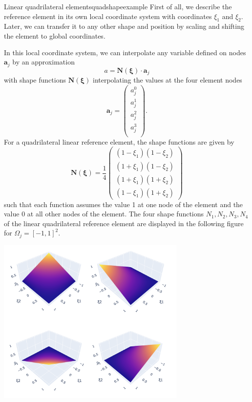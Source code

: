 \begin{example}{Linear quadrilateral elements}{quadshapeexample} 
    First of all, we describe the reference element in its own local coordinate system with coordinates $\xi_1$ and $\xi_2$. Later, we can transfer it to any other shape and position by scaling and shifting the element to global coordinates. 

    In this local coordinate system, we can interpolate any variable defined on nodes $\mathbf{a}_j$ by an approximation
    \begin{equation}
        a = \mathbf{N}(\pmb{\xi}) \cdot  \mathbf{a}_j
    \end{equation}
    with shape functions $\mathbf{N}(\pmb{\xi})$ interpolating the values at the four element nodes
    \begin{equation}
        \mathbf{a}_j = 
        \begin{pmatrix}
            a_j^0\\ 
            a_j^1\\ 
            a_j^2\\ 
            a_j^3\\
        \end{pmatrix}.
    \end{equation}
    For a quadrilateral linear reference element, the shape functions are given by 
    \begin{equation}
        \mathbf{N}(\pmb{\xi}) = \frac{1}{4}
        \begin{pmatrix}
            (1-\xi_1)(1-\xi_2) \\
            (1+\xi_1)(1-\xi_2) \\
            (1+\xi_1)(1+\xi_2) \\
            (1-\xi_1)(1+\xi_2)
        \end{pmatrix}
    \end{equation}
    such that each function assumes the value 1 at one node of the element and the value 0 at all other nodes of the element. The four shape functions $N_1, N_2, N_3, N_4$ of the linear quadrilateral reference element are displayed in the following figure for $\Omega_j = [-1,1]^2$.
    

    \begin{center}
        \includegraphics[width=0.7\textwidth]{figures/quad_shape_functions.png}
    \end{center}


\end{example}
